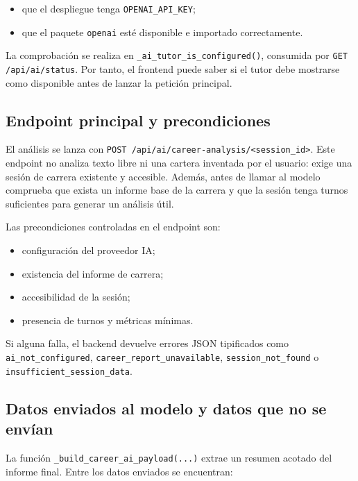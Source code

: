 \begin{itemize}
    \item que el despliegue tenga \texttt{OPENAI\_API\_KEY};
    \item que el paquete \texttt{openai} esté disponible e importado correctamente.
\end{itemize}

La comprobación se realiza en \texttt{\_ai\_tutor\_is\_configured()}, consumida por \texttt{GET /api/ai/status}. Por tanto, el frontend puede saber si el tutor debe mostrarse como disponible antes de lanzar la petición principal.

\subsection{Endpoint principal y precondiciones}

El análisis se lanza con \texttt{POST /api/ai/career-analysis/<session\_id>}. Este endpoint no analiza texto libre ni una cartera inventada por el usuario: exige una sesión de carrera existente y accesible. Además, antes de llamar al modelo comprueba que exista un informe base de la carrera y que la sesión tenga turnos suficientes para generar un análisis útil.

Las precondiciones controladas en el endpoint son:

\begin{itemize}
    \item configuración del proveedor IA;
    \item existencia del informe de carrera;
    \item accesibilidad de la sesión;
    \item presencia de turnos y métricas mínimas.
\end{itemize}

Si alguna falla, el backend devuelve errores JSON tipificados como \texttt{ai\_not\_configured}, \texttt{career\_report\_unavailable}, \texttt{session\_not\_found} o \texttt{insufficient\_session\_data}.

\subsection{Datos enviados al modelo y datos que no se envían}

La función \texttt{\_build\_career\_ai\_payload(...)} extrae un resumen acotado del informe final. Entre los datos enviados se encuentran:

